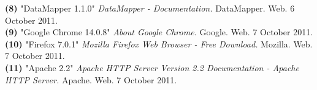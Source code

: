 \documentclass{article}
\begin{document}
\noindent\hangindent=1.4cm
\textbf{(8)} "DataMapper 1.1.0" 
\emph{DataMapper - Documentation.} DataMapper. Web.  6 October 2011.\\

\noindent\hangindent=1.4cm
\textbf{(9)} "Google Chrome 14.0.8" 
\emph{About Google Chrome.} Google. Web.  7 October 2011.\\

\noindent\hangindent=1.4cm
\textbf{(10)} "Firefox 7.0.1" 
\emph{Mozilla Firefox Web Browser - Free Download.} Mozilla. Web.  7 October 2011.\\

\noindent\hangindent=1.4cm
\textbf{(11)} "Apache 2.2" 
\emph{Apache HTTP Server Version 2.2 Documentation - Apache HTTP Server.} Apache. Web.  7 October 2011.\\
\end{document}
